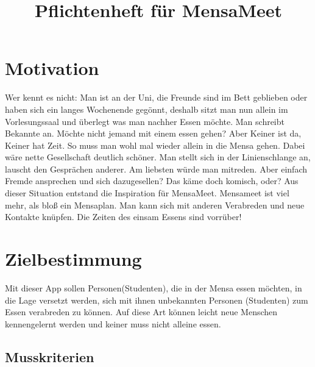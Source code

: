 \documentclass[a4paper]{scrreprt}
\begin{document}
\title{Pflichtenheft für MensaMeet}

\maketitle
 
\tableofcontents

\chapter{Motivation}

Wer kennt es nicht: Man ist an der Uni, die Freunde sind im Bett geblieben oder haben sich ein langes Wochenende gegönnt, deshalb sitzt man nun allein im Vorlesungssaal und überlegt was man nachher Essen möchte. Man schreibt Bekannte an. Möchte nicht jemand mit einem essen gehen? Aber Keiner ist da, Keiner hat Zeit. So muss man wohl mal wieder allein in die Mensa gehen. Dabei wäre nette Gesellschaft deutlich schöner. Man stellt sich in der Linienschlange an, lauscht den Gesprächen anderer. Am liebsten würde man mitreden. Aber einfach Fremde ansprechen und sich dazugesellen? Das käme doch komisch, oder? Aus dieser Situation entstand die Inspiration für MensaMeet. Mensameet ist viel mehr, als bloß ein Mensaplan. Man kann sich mit anderen Verabreden und neue Kontakte knüpfen. Die Zeiten des einsam Essens sind vorrüber!

\chapter{Zielbestimmung}
Mit dieser App sollen Personen(Studenten), die in der Mensa essen möchten, in die Lage versetzt werden, sich mit ihnen unbekannten Personen (Studenten) zum Essen verabreden zu können. Auf diese Art können leicht neue Menschen kennengelernt werden und keiner muss nicht alleine essen.
 
\section{Musskriterien}
\end{document}
